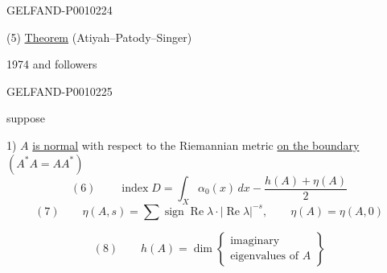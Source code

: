 \begin{GelfandAdjacentEvidence}{GELFAND-P001022}{4}


(5) \underline{Theorem} (Atiyah--Patody--Singer)

1974 and followers
\end{GelfandAdjacentEvidence}
\begin{GelfandAdjacentEvidence}{GELFAND-P001022}{5}


suppose

1) $A$ \underline{is normal} with respect to the Riemannian metric \underline{on the boundary}
\qquad $(A^*A=AA^*)$
\[
(6)\qquad \operatorname{index}D=\int_X\alpha_0(x)\,dx
-\frac{h(A)+\eta(A)}2
\]
\[
(7)\qquad \eta(A,s)=\sum\operatorname{sign}\operatorname{Re}\lambda\cdot
|\operatorname{Re}\lambda|^{-s},\qquad \eta(A)=\eta(A,0)
\]
\end{GelfandAdjacentEvidence}

\[
(8)\qquad h(A)=\dim\left\{\begin{gathered}
\text{imaginary}\\\text{eigenvalues of }A
\end{gathered}\right\}
\]


